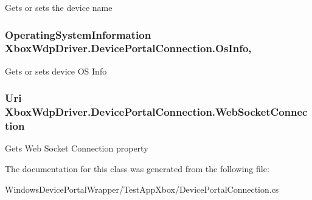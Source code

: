 Gets or sets the device name 

\subsubsection[{\texorpdfstring{Os\+Info}{OsInfo}}]{\setlength{\rightskip}{0pt plus 5cm}Operating\+System\+Information Xbox\+Wdp\+Driver.\+Device\+Portal\+Connection.\+Os\+Info\hspace{0.3cm}{\ttfamily [get]}, {\ttfamily [set]}}\hypertarget{class_xbox_wdp_driver_1_1_device_portal_connection_a9cdea6691c878986b05c56149e6396de}{}\label{class_xbox_wdp_driver_1_1_device_portal_connection_a9cdea6691c878986b05c56149e6396de}


Gets or sets device OS Info 

\subsubsection[{\texorpdfstring{Web\+Socket\+Connection}{WebSocketConnection}}]{\setlength{\rightskip}{0pt plus 5cm}Uri Xbox\+Wdp\+Driver.\+Device\+Portal\+Connection.\+Web\+Socket\+Connection\hspace{0.3cm}{\ttfamily [get]}}\hypertarget{class_xbox_wdp_driver_1_1_device_portal_connection_a874bd3882101be42e70e947a9cfe409c}{}\label{class_xbox_wdp_driver_1_1_device_portal_connection_a874bd3882101be42e70e947a9cfe409c}


Gets Web Socket Connection property 



The documentation for this class was generated from the following file\+:\begin{DoxyCompactItemize}
\item 
Windows\+Device\+Portal\+Wrapper/\+Test\+App\+Xbox/Device\+Portal\+Connection.\+cs\end{DoxyCompactItemize}
